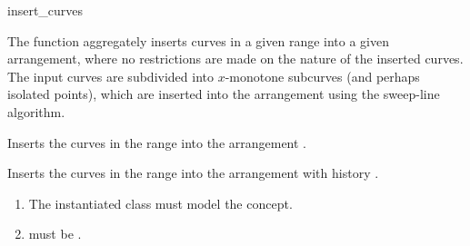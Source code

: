 \ccRefPageBegin

\begin{ccRefFunction}{insert_curves}

\ccDefinition

The function \ccRefName{} aggregately inserts curves in a given range into
a given arrangement, where no restrictions are made on the nature of
the inserted curves.  The input curves are subdivided into
$x$-monotone subcurves (and perhaps isolated points), which are inserted
into the arrangement using the sweep-line algorithm.



Inserts the curves in the range \ccc{[first,last)} into the
arrangement .




Inserts the curves in the range \ccc{[first,last)} into the
arrangement with history .

\ccRequirements
\begin{enumerate}
\item The instantiated  class must model the
   concept.
\item {} must be .
\end{enumerate}

\end{ccRefFunction}

\ccRefPageEnd
